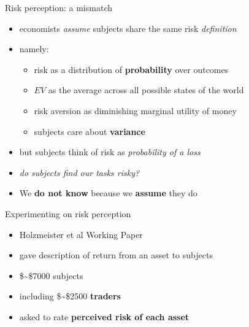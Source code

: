 \documentclass[
  ignorenonframetext,
]{beamer}
\providecommand{\tightlist}{%
  \setlength{\itemsep}{0pt}\setlength{\parskip}{0pt}}
\begin{document}
\begin{frame}{Risk perception: a mismatch}
\protect\hypertarget{risk-perception-a-mismatch}{}

\begin{itemize}
\item
  economists \emph{assume} subjects share the same risk
  \emph{definition}
\item
  namely:

  \begin{itemize}
  \tightlist
  \item
    risk as a distribution of \textbf{probability} over outcomes
  \item
    \(EV\) as the average across all possible states of the world
  \item
    risk aversion as diminishing marginal utility of money
  \item
    subjects care about \textbf{variance}
  \end{itemize}
\item
  but subjects think of risk as \emph{probability of a loss}
\end{itemize}

\begin{itemize}[<+->]
\tightlist
\item
  \emph{do subjects find our tasks risky?}
\end{itemize}

\begin{itemize}[<+->]
\tightlist
\item
  We \textbf{do not know} because we \textbf{assume} they do
\end{itemize}

\end{frame}

\begin{frame}{Experimenting on risk perception}
\protect\hypertarget{experimenting-on-risk-perception}{}

\begin{itemize}
\tightlist
\item
  Holzmeister et al Working Paper
\item
  gave description of return from an asset to subjects
\item
  \$\sim\$7000 subjects
\item
  including \$\sim\$2500 \textbf{traders}
\item
  asked to rate \textbf{perceived risk of each asset}
\end{itemize}

\end{frame}
\end{document}
